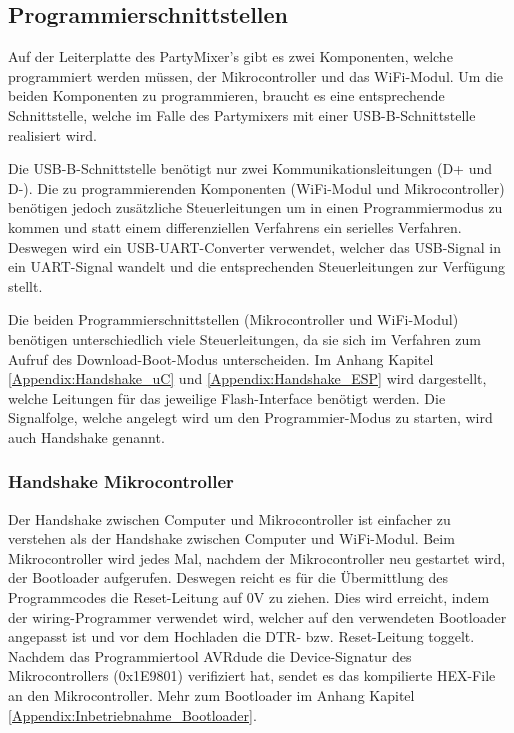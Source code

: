 \clearpage
\subsection{Programmierschnittstellen}
\label{subsec:Programmierschnittstellen}

Auf der Leiterplatte des PartyMixer's gibt es zwei Komponenten, welche programmiert werden müssen, der Mikrocontroller und das WiFi-Modul. Um die beiden Komponenten zu programmieren, braucht es eine entsprechende Schnittstelle, welche im Falle des Partymixers mit einer USB-B-Schnittstelle realisiert wird.

Die USB-B-Schnittstelle benötigt nur zwei Kommunikationsleitungen (D+ und D-). Die zu programmierenden Komponenten (WiFi-Modul und Mikrocontroller) benötigen jedoch zusätzliche Steuerleitungen um in einen Programmiermodus zu kommen und statt einem differenziellen Verfahrens ein serielles Verfahren. Deswegen wird ein USB-UART-Converter verwendet, welcher das USB-Signal in ein UART-Signal wandelt und die entsprechenden Steuerleitungen zur Verfügung stellt. \cite{zenkner_usb_2014}

Die beiden Programmierschnittstellen (Mikrocontroller und WiFi-Modul) benötigen unterschiedlich viele Steuerleitungen, da sie sich im Verfahren zum Aufruf des Download-Boot-Modus unterscheiden. Im Anhang Kapitel \ref{Appendix:Handshake_uC} und \ref{Appendix:Handshake_ESP} wird dargestellt, welche Leitungen für das jeweilige Flash-Interface benötigt werden. Die Signalfolge, welche angelegt wird um den Programmier-Modus zu starten, wird auch Handshake genannt.

\subsubsection{Handshake Mikrocontroller}\label{subsubsec:Handshake_ATMega2560}

Der Handshake zwischen Computer und Mikrocontroller ist einfacher zu verstehen als der Handshake zwischen Computer und WiFi-Modul. Beim Mikrocontroller wird jedes Mal, nachdem der Mikrocontroller neu gestartet wird, der Bootloader aufgerufen. Deswegen reicht es für die Übermittlung des Programmcodes die Reset-Leitung auf 0V zu ziehen. Dies wird erreicht, indem der wiring-Programmer verwendet wird, welcher auf den verwendeten Bootloader angepasst ist und vor dem Hochladen die DTR- bzw. Reset-Leitung toggelt. Nachdem das Programmiertool AVRdude die Device-Signatur des Mikrocontrollers (0x1E9801) verifiziert hat, sendet es das kompilierte HEX-File an den Mikrocontroller. Mehr zum Bootloader im Anhang Kapitel \ref{Appendix:Inbetriebnahme_Bootloader}.

